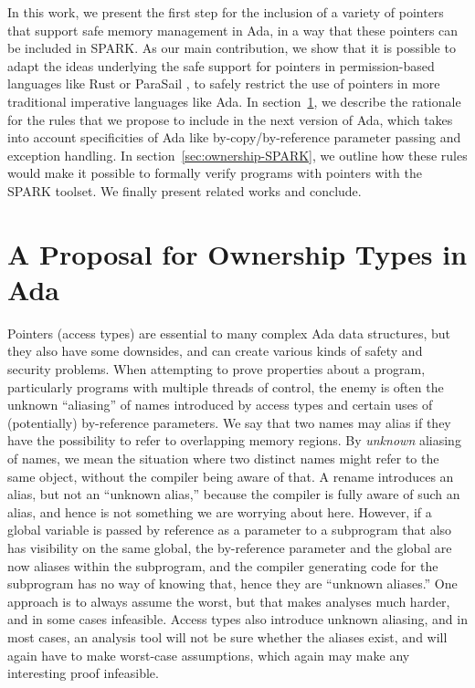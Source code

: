\documentclass{llncs}
\begin{document}
In this work, we present the first step for the inclusion of a variety of pointers that support safe memory management in Ada, in a way that these pointers can be included in SPARK. As our main contribution, we show that it is possible to adapt the ideas underlying the safe support for pointers in permission-based languages like Rust \cite{Balasubramanian17} or ParaSail \cite{Taft11}, to safely restrict the use of pointers in more traditional imperative languages like Ada. In section~\ref{sec:ownership-Ada}, we describe the rationale for the rules that we propose to include in the next version of Ada, which takes into account specificities of Ada like by-copy/by-reference parameter passing and exception handling. In section~\ref{sec:ownership-SPARK}, we outline how these rules would make it possible to formally verify programs with pointers with the SPARK toolset. We finally present related works and conclude.

\section{A Proposal for Ownership Types in Ada}
\label{sec:ownership-Ada}

Pointers (access types) are essential to many complex Ada data structures, but they also have some downsides, and can create various kinds of safety and security problems.
When attempting to prove properties about a program, particularly programs with multiple threads of control, the enemy is often the unknown ``aliasing'' of names introduced by
access types and certain uses of (potentially) by-reference parameters. We say that two names may alias if they have the possibility to refer to overlapping memory regions.
By \textit{unknown} aliasing of names, we mean the situation where two distinct names might refer to the same object, without the compiler being aware of that.  A rename introduces
an alias, but not an ``unknown alias,'' because the compiler is fully aware of such an alias, and hence is not something we are worrying about here. However, if a global
variable is passed by reference as a parameter to a subprogram that also has visibility on the same global, the by-reference parameter and the global are now aliases within
the subprogram, and the compiler generating code for the subprogram has no way of knowing that, hence they are ``unknown aliases.''  One approach is to always assume the worst,
but that makes analyses much harder, and in some cases infeasible. Access types also introduce unknown aliasing, and in most cases, an analysis tool will not be
sure whether the aliases exist, and will again have to make worst-case assumptions, which again may make any interesting proof infeasible.
\end{document}
